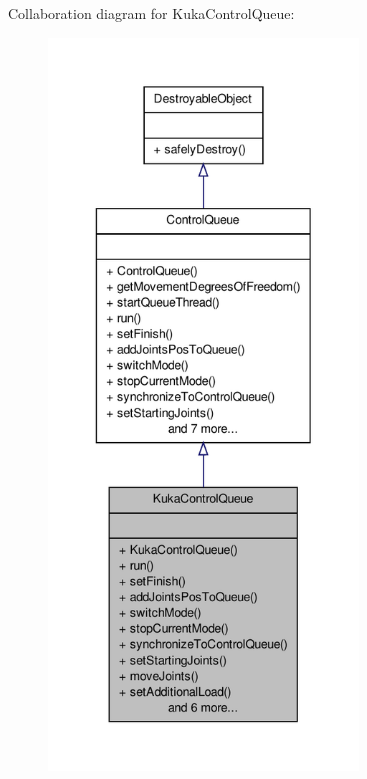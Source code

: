 \-Collaboration diagram for \-Kuka\-Control\-Queue\-:\nopagebreak
\begin{figure}[H]
\begin{center}
\leavevmode
\includegraphics[height=550pt]{classKukaControlQueue__coll__graph}
\end{center}
\end{figure}
